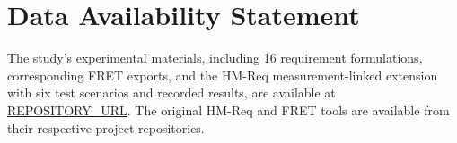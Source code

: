 \section*{Data Availability Statement}
The study's experimental materials, including 16 requirement formulations, corresponding FRET exports, and the HM-Req measurement-linked extension with six test scenarios and recorded results, are available at \url{REPOSITORY_URL}. The original HM-Req and FRET tools are available from their respective project repositories.
